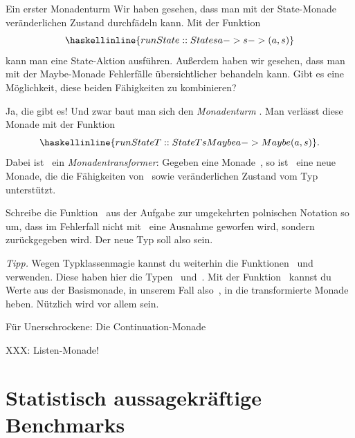 \documentclass{uebblatt}
\begin{document}
\begin{aufgabe}{Ein erster Monadenturm}
Wir haben gesehen, dass man mit der State-Monade veränderlichen Zustand
durchfädeln kann. Mit der Funktion
\[ \haskellinline{runState :: State s a -> s -> (a,s)} \]
kann man eine State-Aktion ausführen. Außerdem haben wir gesehen, dass man mit
der Maybe-Monade Fehlerfälle übersichtlicher behandeln kann. Gibt es eine
Möglichkeit, diese beiden Fähigkeiten zu kombinieren?

Ja, die gibt es! Und zwar baut man sich den \emph{Monadenturm}
. Man verlässt diese Monade mit der Funktion
\[ \haskellinline{runStateT :: StateT s Maybe a -> Maybe (a, s)}. \]
Dabei ist~ ein \emph{Monadentransformer}: Gegeben eine
Monade~, so ist~ eine neue Monade,
die die Fähigkeiten von~ sowie veränderlichen Zustand vom
Typ~ unterstützt.

Schreibe die Funktion~ aus der Aufgabe zur umgekehrten polnischen Notation so um, dass
im Fehlerfall nicht mit~ eine Ausnahme geworfen wird,
sondern~ zurückgegeben wird. Der neue Typ soll also
 sein.

{\scriptsize\emph{Tipp.} Wegen Typklassenmagie kannst du weiterhin die
Funktionen~ und~ verwenden. Diese haben
hier die Typen~
und~. Mit der
Funktion~ kannst du
Werte aus der Basismonade, in unserem Fall also~, in die
transformierte Monade heben. Nützlich wird vor allem  sein.\par}
\end{aufgabe}

\begin{aufgabe}{Für Unerschrockene: Die Continuation-Monade}
\end{aufgabe}

XXX: Listen-Monade!


\section{Statistisch aussagekräftige Benchmarks}
\end{document}
